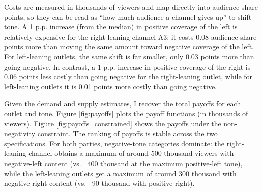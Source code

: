 \documentclass[12pt]{article}
\begin{document}


Costs are measured in thousands of viewers and map directly into audience-share points, so they can be read as “how much audience a channel gives up” to shift tone. A 1 p.p. increase (from the median) in positive coverage of the left is relatively expensive for the right-leaning channel A3: it costs 0.08 audience-share points more than moving the same amount toward negative coverage of the left. For left-leaning outlets, the same shift is far smaller, only 0.03 points more than going negative. In contrast, a 1 p.p. increase in positive coverage of the right is 0.06 points less costly than going negative for the right-leaning outlet, while for left-leaning outlets it is 0.01 points more costly than going negative. 



Given the demand and supply estimates, I recover the total payoffs for each outlet and tone.  Figure \ref{fig:payoffs} plots the payoff functions (in thousands of viewers). Figure \ref{fig:payoffs_constrained} shows the payoffs under the non-negativity constraint. The ranking of payoffs is stable across the two specifications. For both parties, negative-tone categories dominate: the right-leaning channel obtains a maximum of  around 500 thousand viewers with negative-left content (vs. ~400 thousand at the maximum positive-left tone), while the left-leaning outlets get a maximum of around 300 thousand with negative-right content (vs. ~90 thousand with positive-right).

\end{document}
